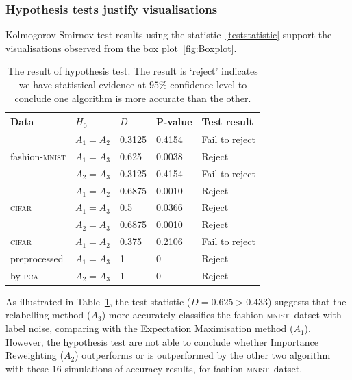 \documentclass[12pt]{article} %
\newcommand{\mnist}{fashion-\textsc{mnist}}
\begin{document}
\subsubsection{Hypothesis tests justify visualisations}
Kolmogorov-Smirnov test results using the statistic~\eqref{teststatistic} support the visualisations observed from the box plot~\ref{fig:Boxplot}.
\begin{table}%
\centering
 	\caption{The result of hypothesis test. The result is `reject' indicates we have  statistical evidence at $95\%$ confidence level to conclude one algorithm is more accurate than the other.}
	\begin{tabular}{lllll}
\toprule
Data & $H_0$ & $D$ & P-value & Test result\\
\midrule
 & $A_1= A_2$  &0.3125 & 0.4154 & Fail to reject\\

\mnist & $A_1= A_3$ & 0.625 & 0.0038 & Reject\\

  & $A_2= A_3$ & 0.3125 & 0.4154 & Fail to reject\\
\midrule
   & $A_1= A_2$ & 0.6875 & 0.0010 & Reject\\

 \textsc{cifar}  & $A_1= A_3$ & 0.5 & 0.0366 & Reject\\

  &  $A_2=A_3$  & 0.6875 & 0.0010 & Reject\\
 \midrule
  \textsc{cifar} & $A_1= A_2$ & 0.375 & 0.2106 & Fail to reject\\

  preprocessed & $A_1= A_3$ & 1 & 0 & Reject\\

  by \textsc{pca} &  $A_2=A_3$  & 1 & 0 & Reject\\
\bottomrule
\end{tabular}

	\label{tab:HypothesisTest}
\end{table}
As illustrated in  Table~\ref{tab:HypothesisTest}, the test statistic ($D=0.625>0.433$) suggests that the relabelling method ($A_3$) more accurately classifies the \mnist\ datset with label noise, comparing with the Expectation Maximisation method ($A_1$).
However, the hypothesis test are not able to conclude whether Importance Reweighting ($A_2$) outperforms or is outperformed by the other two algorithm with these $16$ simulations of accuracy results, for \mnist\ datset.
\end{document}
